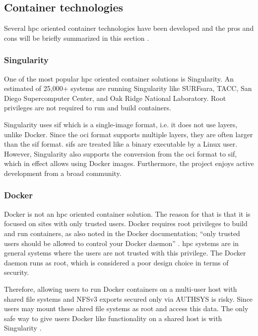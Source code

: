 \documentclass[conference]{IEEEtran}
\begin{document}
\subsection{Container technologies}
Several \gls{hpc} oriented container technologies have been developed and the pros and cons will be briefly summarized in this section \cite{hpc-workloads-justin, saha2018evaluation, stackhpc-state-of-hpc}.


\subsubsection{Singularity}
One of the most popular \gls{hpc} oriented container solutions is Singularity. An estimated of 25,000+ systems are running Singularity like SURFsara, TACC, San Diego Supercomputer Center, and Oak Ridge National Laboratory. Root privileges are not required to run and build containers.

Singularity uses \gls{sif} which is a single-image format, i.e. it does not use layers, unlike Docker. Since the \gls{oci} format supports multiple layers, they are often larger than the \gls{sif} format. \glspl{sif} are treated like a binary executable by a Linux user. However, Singularity also supports the conversion from the \gls{oci} format to \gls{sif}, which in effect allows using Docker images. Furthermore, the project enjoys active development from a broad community.


\subsubsection{Docker}
Docker is not an \gls{hpc} oriented container solution. The reason for that is that it is focused on sites with only trusted users. Docker requires root privileges to build and run containers, as also noted in the Docker documentation; ``only trusted users should be allowed to control your Docker daemon'' \cite{docker-security}. \gls{hpc} systems are in general systems where the users are not trusted with this privilege. The Docker daemon runs as root, which is considered a poor design choice in terms of security.

Therefore, allowing users to run Docker containers on a multi-user host with shared file systems and NFSv3 exports secured only via AUTHSYS is risky. Since users may mount these ahred file systems as root and access this data. The only safe way to give users Docker like functionality on a shared host is with Singularity \cite{cloudy-hutch}.
\end{document}
